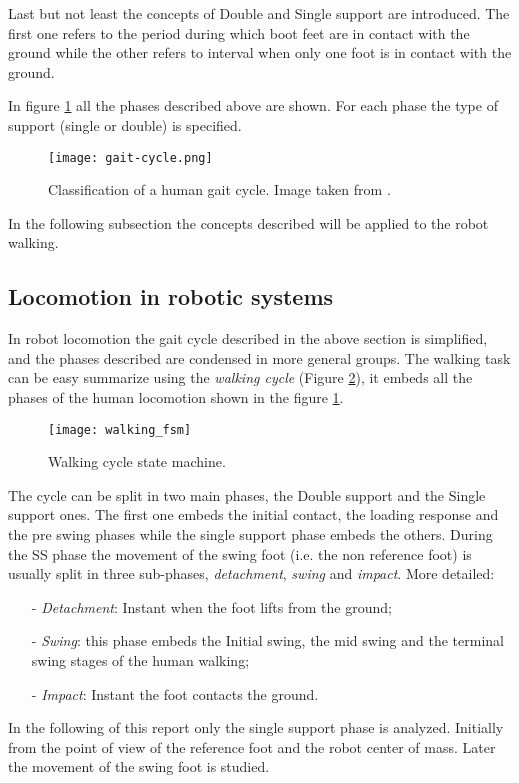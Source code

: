 Last but not least the concepts of Double and Single support are introduced. The first one refers to
the period during which boot feet are in contact with the ground while the other refers to interval when only one foot is in contact with the ground.
\par
In figure \ref{fig:gait-cycle} all the phases described above are shown. For each phase the type of support (single or double) is specified.
\begin{figure}[!ht]
  \centering
  \texttt{[image: gait-cycle.png]}
  \caption{Classification of a human gait cycle. Image taken from \cite{Merker2015}. \label{fig:gait-cycle}}
\end{figure}
\par
In the following subsection the concepts described will be applied to the robot walking.
\subsection{Locomotion in robotic systems}
In robot locomotion the gait cycle described in the above section is simplified,
and the phases described are condensed in more general groups.
The walking task can be easy summarize using the \emph{walking cycle}
(Figure \ref{fig:walking_fsm}), it embeds all the phases of the human locomotion
shown in the figure \ref{fig:gait-cycle}. 
\begin{figure}[!ht]
  \centering
  \texttt{[image: walking\_fsm]}
  \caption{Walking cycle state machine. \label{fig:walking_fsm}}
\end{figure}
\par
The cycle can be split in two main phases, the Double support and the Single support ones.
The first one embeds the initial contact, the loading response and the pre swing phases while the
single support phase embeds the others.
During the SS phase the movement of the swing foot (i.e. the non reference foot)
is usually split in three sub-phases, \emph{detachment}, \emph{swing} and \emph{impact}.
More detailed:
\begin{itemize}
\item[-]\emph{Detachment}: Instant when the foot lifts from the ground;
\item[-]\emph{Swing}: this phase embeds the Initial swing, the mid swing and the terminal swing
  stages of the human walking;
\item[-]\emph{Impact}: Instant the foot contacts the ground.
\end{itemize}
In the following of this report only the single support phase is analyzed. Initially from the point
of view of the reference foot and the robot center of mass. Later the movement of the swing foot is
studied. 

